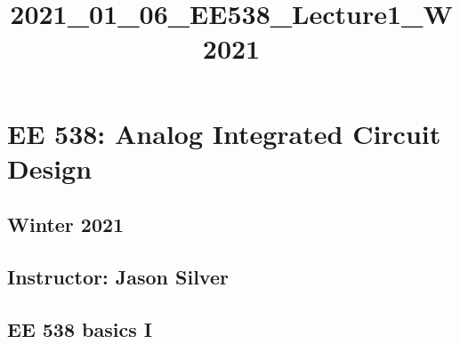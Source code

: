 \documentclass[11pt]{article}
\title{2021\_01\_06\_EE538\_Lecture1\_W2021}
\begin{document}
    
    \maketitle
    
    

    
    \hypertarget{ee-538-analog-integrated-circuit-design}{%
\section{EE 538: Analog Integrated Circuit
Design}\label{ee-538-analog-integrated-circuit-design}}

\hypertarget{winter-2021}{%
\subsection{Winter 2021}\label{winter-2021}}

\hypertarget{instructor-jason-silver}{%
\subsection{Instructor: Jason Silver}\label{instructor-jason-silver}}

    \hypertarget{ee-538-basics-i}{%
\subsection{EE 538 basics I}\label{ee-538-basics-i}}
\end{document}

